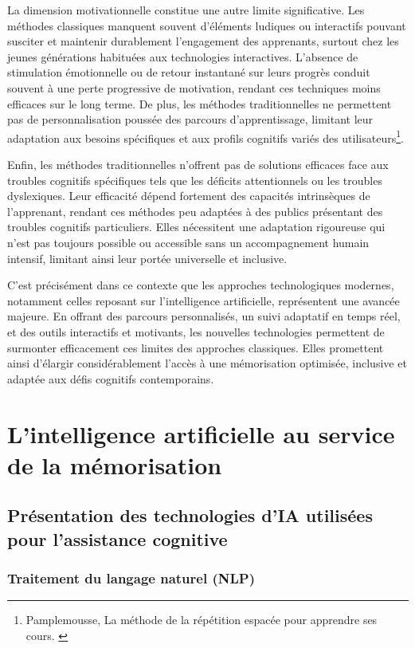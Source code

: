 \documentclass[11pt,a4paper]{report}
\begin{document}
La dimension motivationnelle constitue une autre limite significative. Les méthodes classiques manquent souvent d'éléments ludiques ou interactifs pouvant susciter et maintenir durablement l’engagement des apprenants, surtout chez les jeunes générations habituées aux technologies interactives. L’absence de stimulation émotionnelle ou de retour instantané sur leurs progrès conduit souvent à une perte progressive de motivation, rendant ces techniques moins efficaces sur le long terme. De plus, les méthodes traditionnelles ne permettent pas de personnalisation poussée des parcours d’apprentissage, limitant leur adaptation aux besoins spécifiques et aux profils cognitifs variés des utilisateurs\footnote{Pamplemousse, La méthode de la répétition espacée pour apprendre ses cours. \cite{pamplemousse}}.

Enfin, les méthodes traditionnelles n’offrent pas de solutions efficaces face aux troubles cognitifs spécifiques tels que les déficits attentionnels ou les troubles dyslexiques. Leur efficacité dépend fortement des capacités intrinsèques de l'apprenant, rendant ces méthodes peu adaptées à des publics présentant des troubles cognitifs particuliers. Elles nécessitent une adaptation rigoureuse qui n’est pas toujours possible ou accessible sans un accompagnement humain intensif, limitant ainsi leur portée universelle et inclusive.

C’est précisément dans ce contexte que les approches technologiques modernes, notamment celles reposant sur l’intelligence artificielle, représentent une avancée majeure. En offrant des parcours personnalisés, un suivi adaptatif en temps réel, et des outils interactifs et motivants, les nouvelles technologies permettent de surmonter efficacement ces limites des approches classiques. Elles promettent ainsi d’élargir considérablement l’accès à une mémorisation optimisée, inclusive et adaptée aux défis cognitifs contemporains.

\chapter{L’intelligence artificielle au service de la mémorisation}

\section{Présentation des technologies d’IA utilisées pour l’assistance cognitive}

\subsection{Traitement du langage naturel (NLP)}
\end{document}
